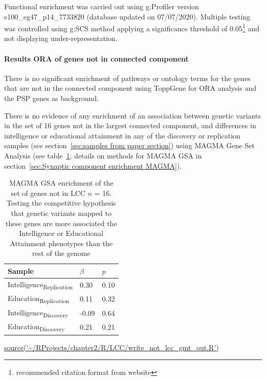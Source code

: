 Functional enrichment was carried out using g:Profiler version e100\_eg47\_p14\_7733820 (database updated on 07/07/2020). Multiple testing was controlled using g:SCS method applying a significance threshold of 0.05\footnote{recommended citation format from website} and not displaying  under-representation.



\paragraph{Results ORA of genes not in connected component}

There is no significant enrichment of pathways or ontology terms for the genes that are not in the connected component using ToppGene for ORA analysis and the PSP genes as background.





There is no evidence of any enrichment of an association between genetic variants in the set of 16 genes not in the largest connected component, and differences in intelligence or educational attainment in any of the discovery or replication samples (see section~\ref{sec:samples from paper section}) using  MAGMA Gene Set Analysis (see table~\ref{tab:notLCC}; details on methods for MAGMA GSA in section~\ref{sec:Synaptic component enrichment MAGMA}).

\begin{table}[]
    \centering
    \begin{tabular}{lll}
    \toprule
     Sample   & $\beta$ & $p$  \\
     \midrule
     Intelligence\textsubscript{Replication} & 0.30 & 0.10\\
     Education\textsubscript{Replication} & 0.11 & 0.32\\
    Intelligence\textsubscript{Discovery} & -0.09 & 0.64\\
    Education\textsubscript{Discovery} & 0.21 & 0.21 \\
    \bottomrule
    \end{tabular}
    \caption[MAGMA GSA for network vertices not in largest connected component]{MAGMA GSA enrichment of the set of genes not in LCC $n$ = 16. Testing the competitive hypothesis that genetic variants mapped to these genes are more associated the Intelligence or Educational Attainment phenotypes than the rest of the genome} 
    \tiny\url{source('~/RProjects/chapter2/R/LCC/write_not_lcc_gmt_out.R')}
    \label{tab:notLCC}
\end{table}
\clearpage

